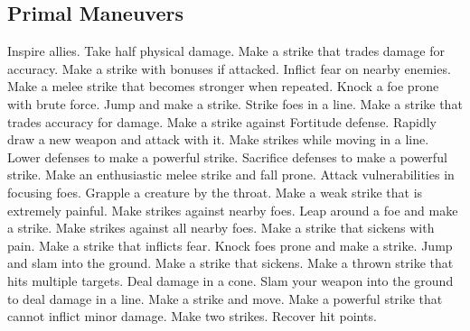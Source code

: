 \small
\subsection{Primal Maneuvers}\label{Primal Maneuvers}
\begin{spelllist}
 Inspire allies.
 Take half physical damage.
 Make a strike that trades damage for accuracy.
 Make a strike with bonuses if attacked.
 Inflict fear on nearby enemies.
 Make a melee strike that becomes stronger when repeated.
 Knock a foe prone with brute force.
 Jump and make a strike.
 Strike foes in a line.
 Make a strike that trades accuracy for damage.
 Make a strike against Fortitude defense.
 Rapidly draw a new weapon and attack with it.
 Make strikes while moving in a line.
 Lower defenses to make a powerful strike.
 Sacrifice defenses to make a powerful strike.
 Make an enthusiastic melee strike and fall prone.
 Attack vulnerabilities in focusing foes.
 Grapple a creature by the throat.
 Make a weak strike that is extremely painful.
 Make strikes against nearby foes.
 Leap around a foe and make a strike.
 Make strikes against all nearby foes.
 Make a strike that sickens with pain.
 Make a strike that inflicts fear.
 Knock foes prone and make a strike.
 Jump and slam into the ground.
 Make a strike that sickens.
 Make a thrown strike that hits multiple targets.
 Deal damage in a cone.
 Slam your weapon into the ground to deal damage in a line.
 Make a strike and move.
 Make a powerful strike that cannot inflict minor damage.
 Make two strikes.
 Recover hit points.
\end{spelllist}



